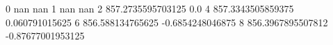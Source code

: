 0 nan nan
1 nan nan
2 857.2735595703125 0.0
4 857.3343505859375 0.060791015625
6 856.588134765625 -0.6854248046875
8 856.3967895507812 -0.87677001953125
